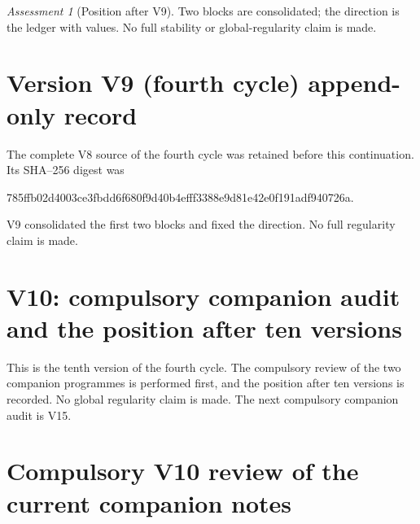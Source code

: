 \documentclass[11pt]{article}
\theoremstyle{plain}
\theoremstyle{definition}
\theoremstyle{remark}
\newtheorem{assessment}[theorem]{Assessment}
\begin{document}
\begin{assessment}[Position after V9]
\label{ass:c4v9-position}
Two blocks are consolidated; the direction is the ledger with
values.  No full stability or global-regularity claim is made.
\end{assessment}

\section*{Version V9 (fourth cycle) append-only record}

The complete V8 source of the fourth cycle was retained before this
continuation.  Its SHA--256 digest was
\begin{center}\scriptsize\ttfamily
785ffb02d4003ce3fbdd6f680f9d40b4efff3388e9d81e42e0f191adf940726a.
\end{center}
V9 consolidated the first two blocks and fixed the direction.  No
full regularity claim is made.

\section{V10: compulsory companion audit and the position after ten versions}
\label{sec:c4v10-entry}

This is the tenth version of the fourth cycle.  The compulsory
review of the two companion programmes is performed first, and the
position after ten versions is recorded.  No global regularity claim
is made.  The next compulsory companion audit is V15.

\section{Compulsory V10 review of the current companion notes}
\label{sec:c4v10-companion-audit}
\end{document}
